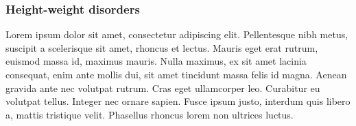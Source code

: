 \subsubsection{Height-weight disorders}\label{sub:heightweightdisorders}
Lorem ipsum dolor sit amet, consectetur adipiscing elit. Pellentesque nibh metus, suscipit a scelerisque sit amet, rhoncus et lectus. Mauris eget erat rutrum, euismod massa id, maximus mauris. Nulla maximus, ex sit amet lacinia consequat, enim ante mollis dui, sit amet tincidunt massa felis id magna. Aenean gravida ante nec volutpat rutrum. Cras eget ullamcorper leo. Curabitur eu volutpat tellus. Integer nec ornare sapien. Fusce ipsum justo, interdum quis libero a, mattis tristique velit. Phasellus rhoncus lorem non ultrices luctus.

